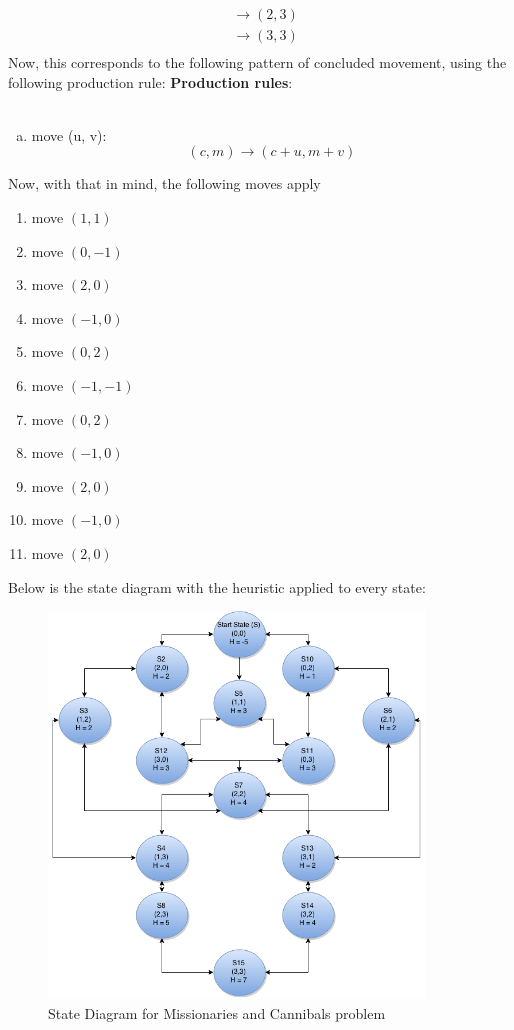 \documentclass[11pt]{article}
\begin{document}
\begin{enumerate}
\begin{align*}
&\rightarrow (2,3)\\
&\rightarrow (3,3)\\
\end{align*}
Now, this corresponds to the following pattern of concluded movement, using the following production rule: 
\textbf{Production rules}:\\\\
\begin{enumerate}[(a)]
\item move (u, v):
$$(c, m) \rightarrow ( c + u, m +v)$$
\end{enumerate}
Now, with that in mind, the following moves apply
\begin{enumerate}[(1)]
\item move $(1,1)$
\item move $(0,-1)$
\item move $(2,0)$
\item move $(-1, 0)$
\item move $(0,2)$
\item move $(-1,-1)$
\item move $(0,2)$
\item move $(-1,0)$
\item move $(2,0)$
\item move $(-1,0)$
\item move $(2,0)$
\end{enumerate}

Below is the state diagram with the heuristic applied to every state: 
\begin{figure}[ht!]
\centering
\includegraphics[width=100mm]{HW1StateDiagram.png}
\caption{State Diagram for Missionaries and Cannibals problem \label{overflow}}
\end{figure}


\end{enumerate}
\end{document}
